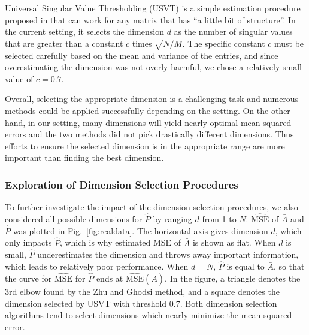 \documentclass[journal,twoside,web]{ieeecolor}
\begin{document}
Universal Singular Value Thresholding (USVT) is a simple estimation procedure proposed in  that can work for any matrix that has ``a little bit of structure''.
In the current setting, it selects the dimension $d$ as the number of singular values that are greater than a constant $c$ times $\sqrt{N/M}$.
The specific constant $c$ must be selected carefully based on the mean and variance of the entries, and since  overestimating the dimension was not overly harmful, we chose a relatively small value of $c=0.7$.

Overall, selecting the appropriate dimension is a challenging task and numerous methods could be applied successfully depending on the setting.
On the other hand, in our setting, many dimensions will yield nearly optimal mean squared errors and the two methods did not pick drastically different dimensions.
Thus efforts to ensure the selected dimension is in the appropriate range are more important than finding the best dimension.



\subsubsection{Exploration of Dimension Selection Procedures}\label{sec:dim}

To further investigate the impact of the dimension selection procedures, we also considered all possible dimensions for $\hat{P}$ by ranging $d$ from 1 to $N$.
$\hat{\mathrm{MSE}}$ of $\bar{A}$ and $\hat{P}$ was plotted in Fig.~\ref{fig:realdata}.
The horizontal axis gives dimension $d$, which only impacts $\hat{P}$, which is why estimated MSE of $\bar{A}$ is shown as flat.
When $d$ is small, $\hat{P}$ underestimates the dimension and throws away important information, which leads to relatively poor performance. When $d=N$, $\hat{P}$ is equal to $\bar{A}$, so that the curve for $\hat{\mathrm{MSE}}$ for $\hat{P}$ ends at $\hat{\mathrm{MSE}}(\bar{A})$.
In the figure, a triangle denotes the 3rd elbow found by the Zhu and Ghodsi method, and a square denotes the dimension selected by USVT with threshold 0.7.
Both dimension selection algorithms tend to select dimensions which nearly minimize the mean squared error.
\end{document}
